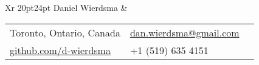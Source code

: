 \documentclass[9pt]{extarticle}
\makeatletter
\newcommand\HUGE{\@setfontsize\Huge{20pt}{24pt}}
\makeatother
\begin{document}
{
    \begin{tabularx}{\textwidth}{Xr}
    {\HUGE\leavevmode\color{em-light} Daniel Wierdsma} &
        \null\hfill\small\begin{tabular}{llX}
            \faMapMarker\space\space\space\color{darkgrey} Toronto, Ontario, Canada & \faEnvelope\space\space\color{darkgrey} \href{mailto:dan.wierdsma@gmail.com}{dan.wierdsma@gmail.com} \\[3px]
            \faGithub\space\space\color{darkgrey} \href{https://github.com/d-wierdsma}{github.com/d-wierdsma} & {\large\faMobilePhone}\space\space\space\color{darkgrey} +1 (519) 635 4151 \\[10px]
        \end{tabular}
    \end{tabularx}

    {\color{lightgrey}{\centerline{\rule{17cm}{0.4pt}}}}
}
\end{document}
